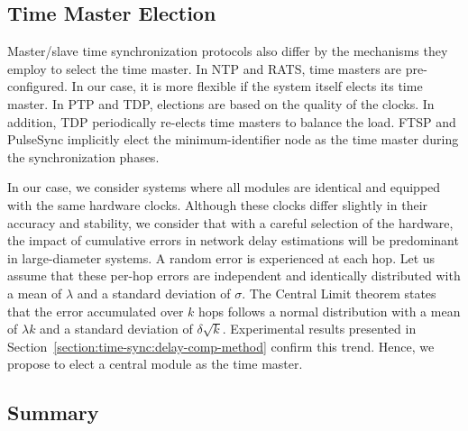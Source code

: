 \subsection{Time Master Election}
\label{section:time-sync:time-master}

Master/slave time synchronization protocols also differ by the mechanisms they employ to select the time master. In NTP and RATS, time masters are pre-configured. In our case, it is more flexible if the system itself elects its time master. In PTP and TDP, elections are based on the quality of the clocks. In addition, TDP periodically re-elects time masters to balance the load. FTSP and PulseSync implicitly elect the minimum-identifier node as the time master during the synchronization phases. 

In our case, we consider systems where all modules are identical and equipped with the same hardware clocks. Although these clocks differ slightly in their accuracy and stability, we consider that with a careful selection of the hardware, the impact of cumulative errors in network delay estimations will be predominant in large-diameter systems. A random error is experienced at each hop. Let us assume that these per-hop errors are independent and identically distributed with a mean of $\lambda$ and a standard deviation of $\sigma$. The Central Limit theorem states that the error accumulated over $k$ hops follows a normal distribution with a mean of $\lambda k$ and a standard deviation of $\delta\sqrt{k}$. Experimental results presented in Section~\ref{section:time-sync:delay-comp-method} confirm this trend. Hence, we propose to elect a central module as the time master.

\subsection{Summary}

